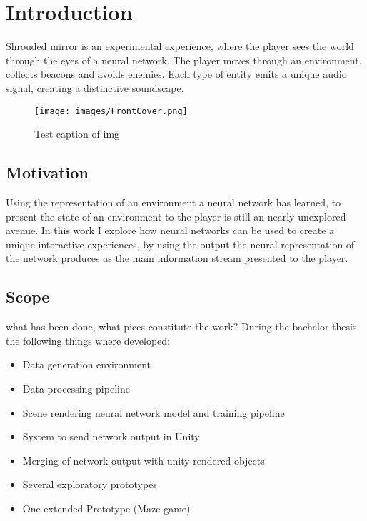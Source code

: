 
\chapter{Introduction}
Shrouded mirror is an experimental experience, where the player sees the world through the eyes of a neural network. The player moves through an environment, collects beacons and avoids enemies. Each type of entity emits a unique audio signal, creating a distinctive soundscape.
\begin{figure}[hbt]
\centering
 {\caption{Test caption of img}
    }
{\texttt{[image: images/FrontCover.png]}}
\end{figure}

\section{Motivation}
Using the representation of an environment a neural network has learned, to present the state of an environment to the player is still an nearly unexplored avenue.
In this work I explore how neural networks can be used to create a unique interactive experiences, by using the output the neural representation of the network produces as the main information stream presented to the player.

\section{Scope}
what has been done, what pices constitute the work?
During the bachelor thesis the following things where developed:

\begin{itemize}
\item{Data generation environment}
\item{Data processing pipeline}
\item{Scene rendering neural network model and training pipeline}
\item{System to send network output in Unity}
\item{Merging of network output with unity rendered objects}
\item{Several exploratory prototypes}
\item{One extended Prototype (Maze game)}
\end{itemize}
